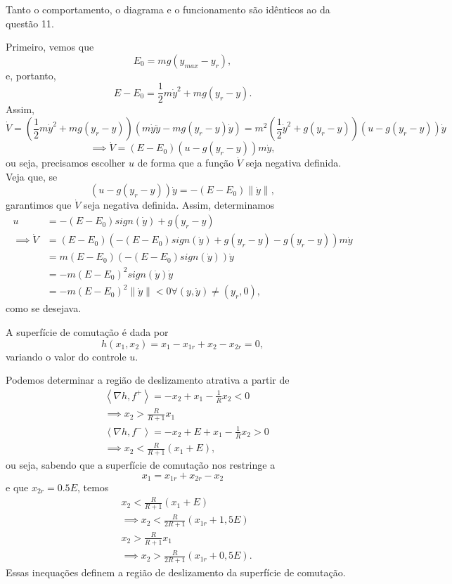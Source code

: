 \documentclass[a4paper]{report}
\begin{document}

Tanto o comportamento, o diagrama e o funcionamento são idênticos ao da questão 11.


Primeiro, vemos que \[
    E_0 = mg(y_{max} - y_r)
,\] e, portanto, \[
E - E_0 = \frac{1}{2}m \dot{y}^2 + mg\left( y_r - y \right) 
.\] Assim, \[
\dot{V} = \left( \frac{1}{2}m \dot{y}^2 + mg\left( y_r -y \right) \right) \left( m\dot{y}\ddot{y} - mg\left( y_r-y \right)\dot{y}  \right) = m^2 \left( \frac{1}{2} \dot{y}^2 + g\left( y_r -y \right) \right) \left( u - g\left( y_r-y \right)\right)\dot{y}
\] \[
\implies \dot{V} = \left( E-E_0 \right) \left( u-g\left( y_r-y \right)  \right) m\dot{y}
,\] ou seja, precisamos escolher $u$ de forma que a função $\dot{V}$ seja negativa definida. Veja que, se \[
\left( u-g\left( y_r - y \right)  \right) \dot{y} = -\left( E-E_0 \right) \|\dot{y}\|
,\] garantimos que $\dot{V}$ seja negativa definida. Assim, determinamos
\begin{align*}
    u &= -\left( E-E_0 \right) sign\left( \dot{y} \right) + g\left( y_r - y \right) \\
    \implies \dot{V} &= \left( E-E_0 \right) \left( -\left( E-E_0 \right) sign\left( \dot{y} \right) + g\left( y_r - y \right)-g\left( y_r-y \right)  \right) m\dot{y} \\
		     &= m\left( E-E_0 \right) \left( -\left( E-E_0 \right) sign(\dot{y}) \right) \dot{y} \\
		     &= -m\left( E-E_0 \right)^2 sign(\dot{y})\dot{y} \\
		     &= -m\left( E-E_0 \right)^2\|\dot{y}\| < 0 \forall (y,\dot{y}) \neq (y_r,0)
,\end{align*}
como se desejava.


A superfície de comutação é dada por \[
h\left( x_1,x_2 \right)  = x_1-x_{1r} + x_2-x_{2r} = 0
,\] variando o valor do controle $u$.

Podemos determinar a região de deslizamento atrativa a partir de
\begin{align*}
    &\left< \nabla h, f^{+}\right> = -x_2 + x_1 - \frac{1}{R}x_2 < 0 \\
    &\implies x_2 > \frac{R }{R+1}x_1 \\
    &\left< \nabla h, f^{-}\right> = -x_2 + E + x_1 - \frac{1}{R}x_2 > 0 \\
    &\implies x_2 < \frac{R }{R+1}\left( x_1+E \right)
,\end{align*}
ou seja, sabendo que a superfície de comutação nos restringe a \[
x_1 = x_{1r} + x_{2r} - x_2
\] e que $x_{2r} = 0.5 E$, temos
\begin{align*}
    &x_2 < \frac{R }{R+1}\left( x_1+E \right) \\
    &\implies x_2 < \frac{R}{2R + 1}\left( x_{1r} + 1,5 E \right) \\
    &x_2 > \frac{R }{R+1}x_1 \\
    &\implies x_2 > \frac{R}{2R + 1}\left( x_{1r} + 0,5 E \right)
.\end{align*}
Essas inequações definem a região de deslizamento da superfície de comutação.
\end{document}
